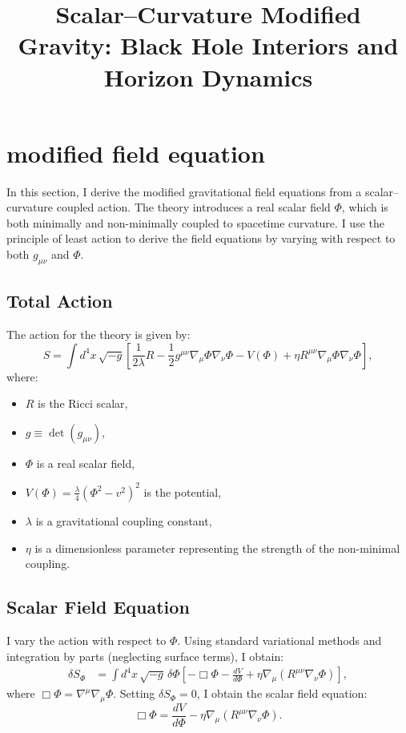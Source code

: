 \documentclass[12pt]{article}
\title{Scalar--Curvature Modified Gravity: Black Hole Interiors and Horizon Dynamics}
\author{}
\date{}
\begin{document}
\maketitle

\section{modified field equation}

In this section, I derive the modified gravitational field equations from a scalar--curvature coupled action. The theory introduces a real scalar field \( \Phi \), which is both minimally and non-minimally coupled to spacetime curvature. I use the principle of least action to derive the field equations by varying with respect to both \( g_{\mu\nu} \) and \( \Phi \).

\subsection{Total Action}

The action for the theory is given by:
\begin{equation}
S = \int d^4x \, \sqrt{-g} \left[ \frac{1}{2\lambda} R - \frac{1}{2} g^{\mu\nu} \nabla_\mu \Phi \nabla_\nu \Phi - V(\Phi) + \eta R^{\mu\nu} \nabla_\mu \Phi \nabla_\nu \Phi \right],
\label{eq:action}
\end{equation}
where:
\begin{itemize}
    \item \( R \) is the Ricci scalar,
    \item \( g \equiv \det(g_{\mu\nu}) \),
    \item \( \Phi \) is a real scalar field,
    \item \( V(\Phi) = \frac{\lambda}{4}(\Phi^2 - v^2)^2 \) is the potential,
    \item \( \lambda \) is a gravitational coupling constant,
    \item \( \eta \) is a dimensionless parameter representing the strength of the non-minimal coupling.
\end{itemize}

\subsection{Scalar Field Equation}

I vary the action with respect to \( \Phi \). Using standard variational methods and integration by parts (neglecting surface terms), I obtain:
\begin{align}
\delta S_\Phi &= \int d^4x \, \sqrt{-g} \, \delta\Phi \left[ -\Box \Phi - \frac{dV}{d\Phi} + \eta \nabla_\mu \left( R^{\mu\nu} \nabla_\nu \Phi \right) \right],
\end{align}
where \( \Box \Phi = \nabla^\mu \nabla_\mu \Phi \). Setting \( \delta S_\Phi = 0 \), I obtain the scalar field equation:
\begin{equation}
\Box \Phi = \frac{dV}{d\Phi} - \eta \nabla_\mu \left( R^{\mu\nu} \nabla_\nu \Phi \right).
\label{eq:phi_eom}
\end{equation}
\end{document}
